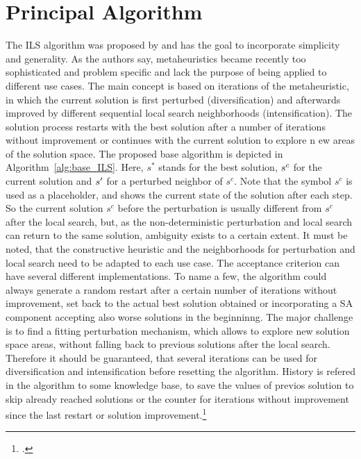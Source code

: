 \section{Principal Algorithm}
\label{sec:algorithm}
The \gls{ILS} algorithm was proposed by \cite{lourenco_iterated_2003} and has the goal to incorporate simplicity and generality.
As the authors say, metaheuristics became recently too sophisticated and problem specific and lack the purpose of
being applied to different use cases. The main concept is based on iterations of the metaheuristic, in which the current
solution is first perturbed (diversification) and afterwards improved by different sequential local search neighborhoods
(intensification). The solution process restarts with the best solution after a number of iterations without improvement
or continues with the current solution to explore n
ew areas of the solution space.
The proposed base algorithm is depicted in Algorithm~\ref{alg:base_ILS}. Here, $s^*$ stands for the best solution,
$s\sp{c}$ for the current solution and $s\sp{\prime}$ for a perturbed neighbor of $s^c$. Note that the symbol $s^c$
is used as a placeholder, and shows the current state of the solution after each step. So the current solution
$s^c$ before the perturbation is usually different from $s^c$ after the local search, but, as the non-deterministic
perturbation and local search can return to the same solution, ambiguity exists to a certain extent.
It must be noted, that the constructive heuristic and  the neighborhoods for perturbation and local search need to be adapted to
each use case. The acceptance criterion can have several different implementations. To name a few, the algorithm could always
generate a random restart after a certain number of iterations without improvement, set back to the actual best solution
obtained or incorporating a \gls{SA} component accepting also worse solutions in the beginninng. The major challenge is
to find a fitting perturbation mechanism, which allows to explore new solution space areas, without falling back to previous solutions
after the local search. Therefore it should be guaranteed, that several iterations can be used for diversification and
intensification before resetting the algorithm. History is refered in the algorithm to some knowledge base,
to save the values of previos solution to skip already reached solutions or the counter for iterations without improvement since the
last restart or solution improvement.\footcite[cf.][]{lourenco_iterated_2003}


